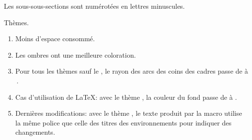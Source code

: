 \begin{tdocupdate}
	\item Les sous-sous-sections sont numérotées en lettres minuscules.

	\item Thèmes.
	\begin{enumerate}
		\item Moins d'espace consommé.

		\item Les ombres ont une meilleure coloration.

		\item Pour tous les thèmes sauf le , le rayon des arcs des coins des cadres passe de \tdoclatexin{.75mm} à \tdoclatexin{.2pt}\,.

 		\item Cas d'utilisation de \LaTeX: avec le thème , la couleur du fond passe de  à .

		\item Dernières modifications: avec le thème , le texte \tdoclatexin{[Init]} produit par la macro  utilise la même police que celle des titres des environnements pour indiquer des changements.
	\end{enumerate}
\end{tdocupdate}
